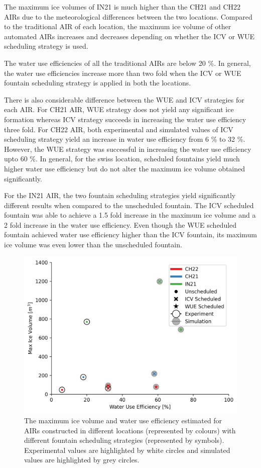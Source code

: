 \documentclass[tc, manuscript]{copernicus}
\begin{document}
The maximum ice volumes of IN21 is much higher than the CH21 and CH22 AIRs due to the meteorological differences
between the two locations. Compared to the traditional AIR of each location, the maximum ice volume of other
automated AIRs increases and decreases depending on whether the ICV or WUE scheduling strategy is used. 

The water use efficiencies of all the traditional AIRs are below 20 \%. In general, the water use efficiencies
increase more than two fold when the ICV or WUE fountain scheduling strategy is applied in both the locations.  

There is also considerable difference between the WUE and ICV strategies for each AIR. For CH21 AIR, WUE
strategy does not yield any significant ice formation whereas ICV strategy succeeds in increasing the water use
efficiency three fold. For CH22 AIR, both experimental and simulated values of ICV scheduling strategy yield an
increase in water use efficiency from 6 \% to 32 \%. However, the WUE strategy was successful in increasing the
water use efficiency upto 60 \%. In general, for the swiss location, scheduled fountains yield much higher water
use efficiency but do not alter the maximum ice volume obtained significantly.

For the IN21 AIR, the two fountain scheduling strategies yield significantly different results when compared
to the unscheduled fountain. The ICV scheduled fountain was able to achieve a 1.5 fold increase in the maximum
ice volume and a 2 fold increase in the water use efficiency. Even though the WUE scheduled fountain achieved
water use efficiency higher than the ICV fountain, its maximum ice volume was even lower than the unscheduled
fountain.

\begin{figure}[t]
\includegraphics[width=12cm]{Figures/wue.png}

\caption{The maximum ice volume and water use efficiency estimated for AIRs constructed in different locations
(represented by colours) with different fountain scheduling strategies (represented by symbols). Experimental
values are highlighted by white circles and simulated values are highlighted by grey circles.  }

\label{fig:wue}
\end{figure}
\end{document}

